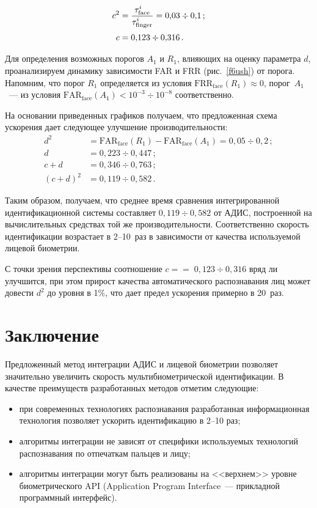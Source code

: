 \begin{multicols}{2}
\noindent
     \begin{align*}
     c^2 & = \displaystyle\frac{\displaystyle \tau^i_{\mathrm{face}}\mathstrut}{\displaystyle \tau^i_{\mathrm{finger}}\mathstrut} = 0{,}03\div
0{,}1\,;\\[2pt]
     c & =  0{,}123\div 0{,}316\,.
     \end{align*}

     Для определения возможных порогов $A_1$ и $R_1$, влияющих на оценку
параметра $d$, проанализируем динамику зависимости FAR и FRR (рис.~\ref{f6ush}) 
от порога. Напомним, что порог $R_1$ определяется из
условия $\mathrm{FRR}_{\mathrm{face}}(R_1)\approx 0$, порог~$A_1$~--- из условия 
$\mathrm{FAR}_{\mathrm{face}}(A_1) < 10^{-3}\div 10^{-8}$ соответственно.



     На основании приведенных графиков получаем, что предложенная схема
ускорения дает следующее улучшение производительности:
     \begin{align*}
     d^2 & = \mathrm{FAR}_{\mathrm{face}}(R_1) -
\mathrm{FAR}_{\mathrm{face}}(A_1) =0{,}05\div 0{,}2\,;\\[2pt]
     d & = 0{,}223\div 0{,}447\,;\\[2pt]
     c+d & = 0{,}346\div 0{,}763\,;\\[2pt]
     (c+d)^2 & = 0{,}119\div 0{,}582\,.
     \end{align*}

     Таким образом, получаем, что среднее время сравнения интегрированной
идентификационной системы составляет $0{,}119\div 0{,}582$ от АДИС, построенной
на вычислительных средствах той же производительности. Соответственно скорость
идентификации возрастает в 2--10~раз в зависимости от качества используемой
лицевой биометрии.

     С точки зрения перспективы соотношение $c=$\linebreak $=\;0{,}123\div 0{,}316$ вряд ли
улучшится, при этом прирост качества автоматического распознавания лиц может
довести $d^2$ до уровня в 1\%, что дает предел ускорения примерно в 20~раз.

\vspace*{-6pt}

\section{Заключение}

     Предложенный метод интеграции АДИС и лицевой биометрии позволяет
значительно увеличить скорость мультибиометрической идентификации.
     В качестве преимуществ разработанных методов отметим следующие:
     \begin{itemize}
\item при современных технологиях распознавания разработанная информационная
технология позволяет ускорить идентификацию в 2--10 раз;
\item алгоритмы интеграции не зависят от специфики используемых технологий
распознавания по отпечаткам пальцев и лицу;
\item алгоритмы интеграции могут быть реализованы на <<верхнем>> уровне
биометрического API (Application Program Interface~--- прикладной программный
интерфейс).
\end{itemize}


\end{multicols}
